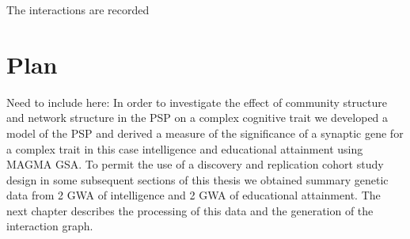 The interactions are recorded 

\section{Plan}
\label{sec:intro plan to procede to next chapter}

Need to include here: In order to investigate the effect of community structure and network structure in the PSP on a complex cognitive trait we developed a model of the PSP and derived a measure of the significance of a synaptic gene for a complex trait in this case intelligence and educational attainment using MAGMA GSA. To permit the use of a discovery and replication cohort study design in some subsequent sections of this thesis we obtained summary genetic data from 2 GWA of intelligence and 2 GWA of educational attainment. The next chapter describes the processing of this data and the generation of the interaction graph.
